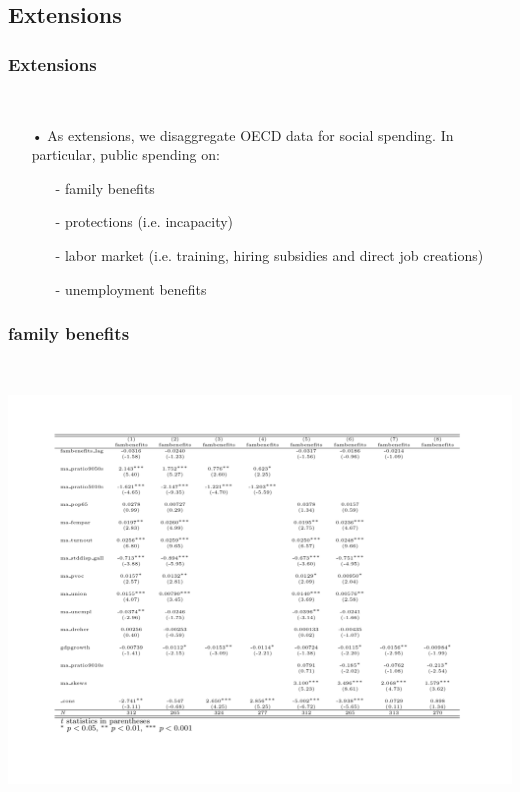 \documentclass{beamer}
\begin{document}
\begin{frame}
\subsection{Extensions} 
\frametitle{Extensions}\
\begin{itemize}
\item[•] As extensions, we disaggregate OECD data for social spending. In particular, public spending on:
\medskip
\begin{itemize}
\item[-] family benefits
\item[-] protections (i.e. incapacity)
\item[-] labor market (i.e. training, hiring subsidies and direct job creations)
\item[-] unemployment benefits
\end{itemize} 
\end{itemize}
\end{frame}

\begin{frame}
\frametitle{family benefits}\
\begin{center}
\includegraphics[scale=0.35]{family}
\end{center}
\end{frame}
\end{document}
